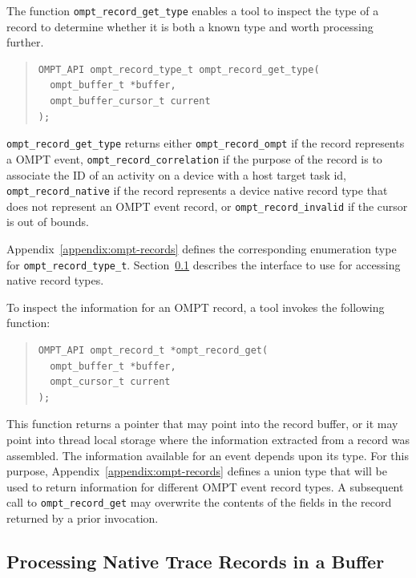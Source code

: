 \documentclass{article}
\begin{document}
The function \verb|ompt_record_get_type| enables a tool to inspect the type of a record to determine whether it is both a known type and worth processing further. 
\begin{quote}
\begin{verbatim}
OMPT_API ompt_record_type_t ompt_record_get_type(
  ompt_buffer_t *buffer, 
  ompt_buffer_cursor_t current
);
\end{verbatim}
\end{quote}
\verb|ompt_record_get_type| returns either \verb|ompt_record_ompt| if the record represents a OMPT event,  \verb|ompt_record_correlation| if the purpose of the record is to associate the ID of an activity on a device with a host target task id, \verb|ompt_record_native| if the record represents a device native record type that does not represent an OMPT event record, or \verb|ompt_record_invalid| if the cursor is out of bounds. 

Appendix~\ref{appendix:ompt-records} defines the corresponding enumeration type for \verb|ompt_record_type_t|. 
Section~\ref{sec:native-record-data} describes the interface to use for accessing native record types.
 

To inspect the information for an OMPT record, a tool invokes the following function:
\begin{quote}
\begin{verbatim}
OMPT_API ompt_record_t *ompt_record_get(
  ompt_buffer_t *buffer, 
  ompt_cursor_t current
);
\end{verbatim}
\end{quote}
This function returns a pointer that may point into the record buffer, or it may point into thread local storage where the information extracted from a record was assembled. The information available for an event depends upon its type. For this purpose, Appendix~\ref{appendix:ompt-records} defines a union type that will be used to return information for different OMPT event record types. A subsequent call to \verb|ompt_record_get| may overwrite the contents of the fields in the record returned by a prior invocation.

\subsection{Processing Native Trace Records in a Buffer}
\label{sec:native-record-data}
\end{document}
